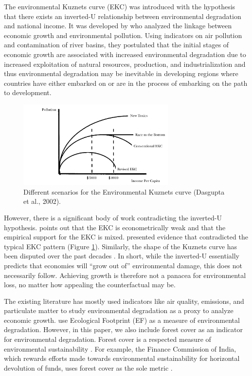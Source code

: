 \documentclass[a4paper,12pt]{article}
\begin{document}
The environmental Kuznets curve (EKC) was introduced with the hypothesis that there exists an inverted-U relationship between environmental degradation and national income. It was developed by \textcite{grossman1991} who analyzed the linkage between economic growth and environmental pollution. Using indicators on air pollution and contamination of river basins, they postulated that the initial stages of economic growth are associated with increased environmental degradation due to increased exploitation of natural resources, production, and industrialization and thus environmental degradation may be inevitable in developing regions where countries have either embarked on or are in the process of embarking on the path to development.

\begin{figure}[h]
    \centering
    \includegraphics[width=0.7\textwidth]{images/kuznets_scen.png}
    \caption{Different scenarios for the Environmental Kuznets curve (Dasgupta et al., 2002).}
    \label{fig:kuznets}
\end{figure}

However, there is a significant body of work contradicting the inverted-U hypothesis. \textcite{stern2004} points out that the EKC is econometrically weak and that the empirical support for the EKC is mixed. \textcite{dasgupta2002} presented evidence that contradicted the typical EKC pattern (Figure \ref{fig:kuznets}). Similarly, the shape of the Kuznets curve has been disputed over the past decades \parencite{caviglia2009,kalka2013,list1999}. In short, while the inverted-U essentially predicts that economies will “grow out of” \parencite{shafik1992} environmental damage, this does not necessarily follow. Achieving growth is therefore not a panacea for environmental loss, no matter how appealing the counterfactual may be.

The existing literature has mostly used indicators like air quality, emissions, and particulate matter to study environmental degradation as a proxy to analyze economic growth. \textcite{caviglia2009} use Ecological Footprint (EF) as a measure of environmental degradation. However, in this paper, we also include forest cover as an indicator for environmental degradation. Forest cover is a respected measure of environmental sustainability \parencite{wang2003}. For example, the Finance Commission of India, which rewards efforts made towards environmental sustainability for horizontal devolution of funds, uses forest cover as the sole metric \parencite{finance2020}.
\end{document}
